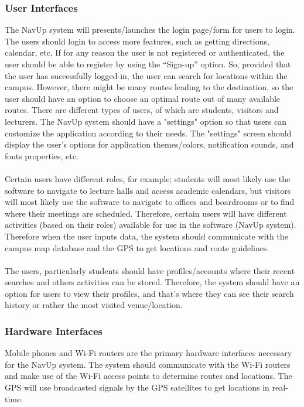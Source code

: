 \documentclass[12pt, a4paper]{article}
\begin{document}
	\subsubsection{User Interfaces}
The NavUp system will presents/launches the login page/form for users to login. The users should login to access more features, 
such as getting directions, calendar, etc. If for any reason the user is not registered or authenticated, the user should be able to 
register by using the “Sign-up” option. So, provided that the user has successfully logged-in, the user can search for locations within 
the campus. However, there might be many routes leading to the destination, so the user should have an option to choose an optimal 
route out of many available routes. There are different types of users, of which are students, visitors and lecturers.\newline
The NavUp system should have a "settings" option so that users can customize the application according to their needs. 
The "settings" screen should display the user's options for application themes/colors, notification sounds, and fonts properties, etc.\\\\
Certain users have different roles, for example; students will most likely use the software to navigate to lecture halls and access academic calendars, 
but visitors will most likely use the software to navigate to offices and boardrooms or to find where their meetings are scheduled. 
Therefore, certain users will have different activities (based on their roles) available for use in the software (NavUp system).
 Therefore when the user inputs data, the system should communicate with the campus map database and the GPS to get locations and route guidelines.\\\\
The users, particularly students should have profiles/accounts where their recent searches and others activities can be stored. 
Therefore, the system should have an option for users to view their profiles, and that’s where they can see their search history or rather the most visited venue/location. \\

	\subsubsection{Hardware Interfaces}
Mobile phones and Wi-Fi routers are the primary hardware interfaces necessary for the NavUp system. The system should communicate
 with the Wi-Fi routers and make use of the Wi-Fi access points to determine routes and locations. The GPS will use broadcasted signals by 
the GPS satellites to get locations in real-time. \\
\end{document}

